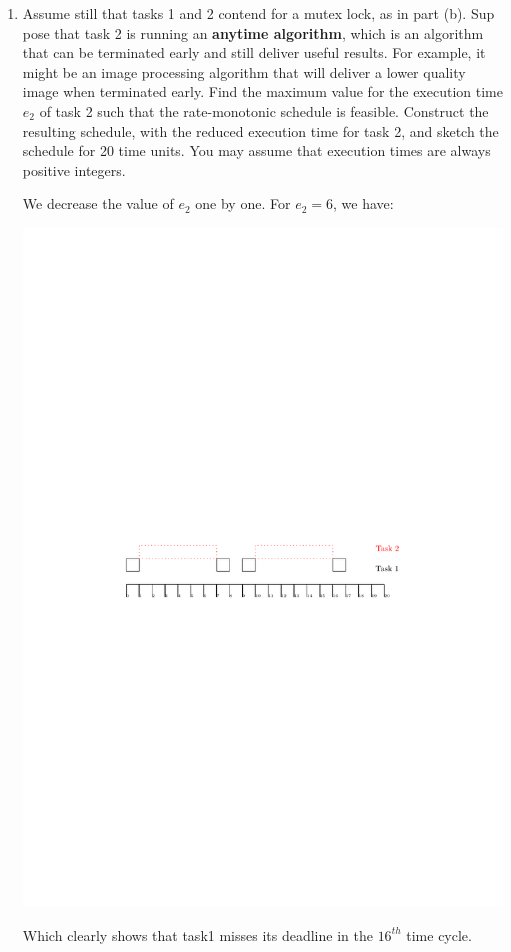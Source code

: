 \documentclass[12pt]{article}
\begin{document}
\begin{enumerate}
	\item 
	Assume still that tasks 1 and 2 contend for a mutex lock, as in part (b). Sup
	pose that task 2 is running an \textbf{anytime algorithm}, which is an algorithm that
	can be terminated early and still deliver useful results. For example, it might
	be an image processing algorithm that will deliver a lower quality image when
	terminated early. Find the maximum value for the execution time $e_2$ of task
	2 such that the rate-monotonic schedule is feasible. Construct the resulting
	schedule, with the reduced execution time for task 2, and sketch the schedule
	for 20 time units. You may assume that execution times are always positive
	integers.
	\begin{qsolve}
		We decrease the value of $e_2$ one by one. For $e_2=6$, we have:
		\begin{center}
			\includegraphics*[width=0.7\linewidth]{images/Q4/c.pdf}
		\end{center}
	\end{qsolve}
	
	\begin{qsolve}
		Which clearly shows that task1 misses its deadline in the $16^{th}$ time cycle.
		

\end{qsolve}
\end{enumerate}
\end{document}
